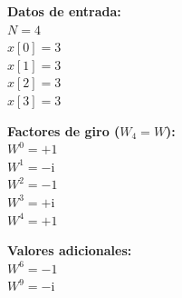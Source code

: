 \documentclass[12pt]{article}
\begin{document}
\noindent
\begin{minipage}[t]{0.3\textwidth}
    \textbf{Datos de entrada:} \\[0.2cm]
    $N = 4$ \\[0.2cm]
    $x[0] = 3$ \\
    $x[1] = 3$ \\
    $x[2] = 3$ \\
    $x[3] = 3$
\end{minipage}
\begin{minipage}[t]{0.3\textwidth}
    \textbf{Factores de giro ($W_4 = W$):} \\[0.2cm]
    $W^0 = +1$ \\
    $W^1 = -\text{i}$ \\
    $W^2 = -1$ \\
    $W^3 = +\text{i}$ \\
    $W^4 = +1$
\end{minipage}
\begin{minipage}[t]{0.3\textwidth}
    \textbf{Valores adicionales:} \\[0.2cm]
    $W^6 = -1$ \\
    $W^9 = -\text{i}$
\end{minipage}
\end{document}
